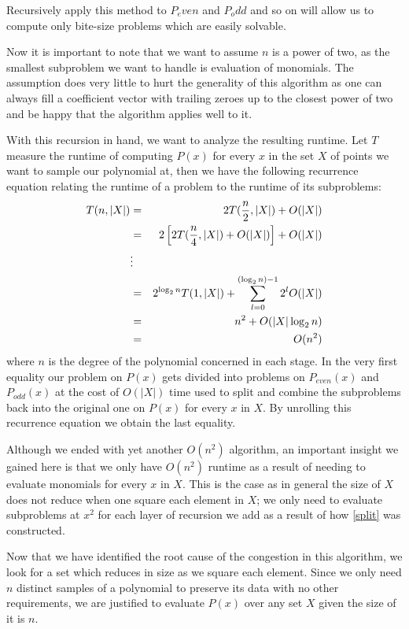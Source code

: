 \documentclass[12pt]{article}
\begin{document}
Recursively apply this method to $P_even$ and $P_odd$ and so on will allow us to compute only bite-size problems which are easily solvable.

Now it is important to note that we want to assume $n$ is a power of two, as the smallest subproblem we want to handle is evaluation of monomials. The assumption does very little to hurt the generality of this algorithm as one can always fill a coefficient vector with trailing zeroes up to the closest power of two and be happy that the algorithm applies well to it. 

With this recursion in hand, we want to analyze the resulting runtime. Let $T$ measure the runtime of computing $P(x)$ for every $x$ in the set $X$ of points we want to sample our polynomial at, then we have the following recurrence equation relating the runtime of a problem to the runtime of its subproblems:
\begin{eqnarray} 
	T(n,|X|) &=& 2T(\frac{n}{2}, |X|) + O(|X|)\notag\\
	&=& 2\left[2T(\frac{n}{4}, |X|)+O(|X|)\right]+O(|X|)\notag\\
	&\vdots&\notag\\
	&=& 2^{\log_2{n}}T(1,|X|)+\sum_{l=0}^{(\log_2{n})-1}2^lO(|X|) \label{recurrence}\\
	&=& n^2+O(|X|\log_2{n})\notag\\
	&=& O(n^2)\notag
\end{eqnarray}
where $n$ is the degree of the polynomial concerned in each stage. In the very first equality our problem on $P(x)$ gets divided into problems on $P_{even}(x)$ and $P_{odd}(x)$ at the cost of $O(|X|)$ time used to split and combine the subproblems back into the original one on $P(x)$ for every $x$ in $X$. By unrolling this recurrence equation we obtain the last equality.

Although we ended with yet another $O(n^2)$ algorithm, an important insight we gained here is that we only have $O(n^2)$ runtime as a result of needing to evaluate monomials for every $x$ in $X$. This is the case as in general the size of $X$ does not reduce when one square each element in $X$; we only need to evaluate subproblems at $x^2$ for each layer of recursion we add as a result of how \eqref{split} was constructed.

Now that we have identified the root cause of the congestion in this algorithm, we look for a set which reduces in size as we square each element. Since we only need $n$ distinct samples of a polynomial to preserve its data with no other requirements, we are justified to evaluate $P(x)$ over any set $X$ given the size of it is $n$. 
\end{document}

